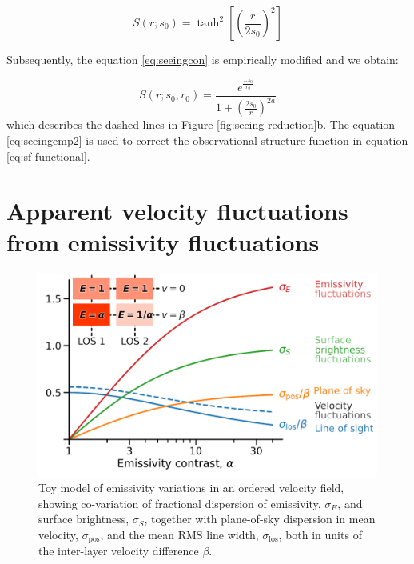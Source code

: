 \documentclass[fleqn,usenatbib, useAMS, a4paper]{mnras}
\newcommand\pos{\ensuremath{_{\mathrm{pos}}}}
\newcommand\los{\ensuremath{_{\mathrm{los}}}}
\begin{document}
\begin{equation}\label{eq:seeingcon}
S (r;s_0) = \tanh^2 \left[ \left( \dfrac{r}{2s_0} \right)^2 \right]
\end{equation}

Subsequently, the equation \ref{eq:seeingcon} is empirically modified and we obtain: 

%

\begin{equation}\label{eq:seeingemp2}
S(r; s_0, r_0) = \frac{e^\frac{-s_0}{r_0}}{1+(\frac{2s_0}{r})^{2a}}
\end{equation}
%
which describes the dashed lines in Figure \ref{fig:seeing-reduction}b. 
The equation \ref{eq:seeingemp2} is used to correct the observational structure function in equation \eqref{eq:sf-functional}. 

\section{Apparent velocity fluctuations from emissivity fluctuations}
\label{sec:appar-veloc-fluct}

\begin{figure}
  \centering
  \includegraphics[width=\linewidth]{Figures/bright-to-vel-fluct-annotated}
  \caption{
    Toy model of emissivity variations in an ordered velocity field,
    showing co-variation of fractional dispersion of
    emissivity, \(\sigma_E\), and surface brightness, \(\sigma_S\),
    together with plane-of-sky dispersion in mean velocity,
    \(\sigma\pos\),
    and the mean RMS line width, \(\sigma\los\),
    both in units of the inter-layer velocity difference \(\beta\).
  }
  \label{fig:bright-to-vel-fluct}
\end{figure}
\end{document}
